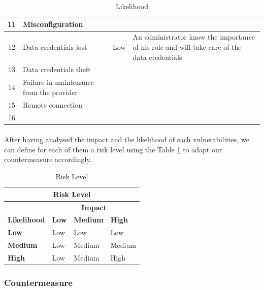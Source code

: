 \documentclass[a4paper,10pt]{article}
\begin{document}
\begin{table}[!h]
\begin{tabular}{|c|p{}|c|p{10cm}|}
		\hline
		11 & Misconfiguration &  & \\
		\hline
		12 & Data credentials lost & Low & An administrator know the importance of his role and will take care of the data credentials. \\
		\hline
		13 &  Data credentials theft&  & \\
		\hline
		14 & Failure in maintenance from the provider &  & \\
		\hline
		15 & Remote connection &  & \\
		\hline
		16 &  &  & \\
		\hline
	\end{tabular}
	\caption{Likelihood}
\end{table}

\paragraph{} After having analysed the impact and the likelihood of each vulnerabilities, we can define for each of them a risk level using the Table \ref{table:RL} to adapt our countermeasure accordingly.

\begin{table}[!h]
	\centering
	\begin{tabular}{|l|l|l|l|}
		\hline
		\multicolumn{4}{|c|}{\textbf{Risk Level}} \\
		\hline
		 & \multicolumn{3}{|c|}{\textbf{Impact}}  \\ \hline
		\textbf{Likelihood} & \textbf{Low} & \textbf{Medium} & \textbf{High} \\ \hline
		\textbf{Low}& Low & Low & Low \\ \hline
		\textbf{Medium} & Low & Medium & Medium \\ \hline
		\textbf{High} & Low & Medium & High \\ \hline
	\end{tabular}
	\caption{Risk Level}
	\label{table:RL}
\end{table}

\subsubsection{Countermeasure}
\end{document}

